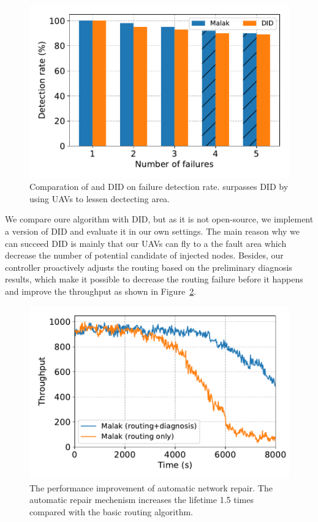\begin{figure}[htbp]
	\centering
	\includegraphics[width=.95\columnwidth]{Figure/did_comp}
	\vspace{-0.1in}
	\caption{Comparation of {\sdn} and DID on failure detection rate.
		\textnormal{
			{\sdn} surpasses DID by using UAVs to lessen dectecting area.
		}}
	\label{fig:did_comp}
\end{figure}

We compare oure algorithm with DID\cite{gong2015directional}, but as it is
not open-source, we implement a version of DID and evaluate it in our own
settings. The main reason why we can succeed DID is mainly that our UAVs can fly
to a the fault area which decrease the number of potential candidate of injected
nodes. Besides, our controller proactively adjusts the routing based on the
preliminary diagnosis results, which make it possible to decrease the routing
failure before it happens and improve the throughput as shown in
Figure~\ref{fig:diagnosis}.

\begin{figure}[htbp]
	\centering
	\includegraphics[width=.95\columnwidth]{Figure/diagnosis}
	\vspace{-0.1in}
	\caption{The performance improvement of automatic network repair.
		\textnormal{
			The automatic repair mechenism increases the lifetime 1.5 times
			compared with the basic {\sdn} routing algorithm.
		}}
	\label{fig:diagnosis}
\end{figure}

